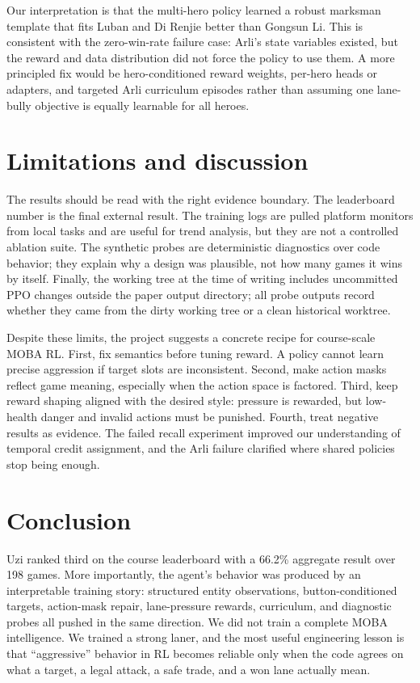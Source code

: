 \documentclass{article}
\begin{document}
Our interpretation is that the multi-hero policy learned a robust marksman template that fits Luban and Di Renjie better than Gongsun Li. This is consistent with the zero-win-rate failure case: Arli's state variables existed, but the reward and data distribution did not force the policy to use them. A more principled fix would be hero-conditioned reward weights, per-hero heads or adapters, and targeted Arli curriculum episodes rather than assuming one lane-bully objective is equally learnable for all heroes.

\section{Limitations and discussion}

The results should be read with the right evidence boundary. The leaderboard number is the final external result. The training logs are pulled platform monitors from local tasks and are useful for trend analysis, but they are not a controlled ablation suite. The synthetic probes are deterministic diagnostics over code behavior; they explain why a design was plausible, not how many games it wins by itself. Finally, the working tree at the time of writing includes uncommitted PPO changes outside the paper output directory; all probe outputs record whether they came from the dirty working tree or a clean historical worktree.

Despite these limits, the project suggests a concrete recipe for course-scale MOBA RL. First, fix semantics before tuning reward. A policy cannot learn precise aggression if target slots are inconsistent. Second, make action masks reflect game meaning, especially when the action space is factored. Third, keep reward shaping aligned with the desired style: pressure is rewarded, but low-health danger and invalid actions must be punished. Fourth, treat negative results as evidence. The failed recall experiment improved our understanding of temporal credit assignment, and the Arli failure clarified where shared policies stop being enough.

\section{Conclusion}

Uzi ranked third on the course leaderboard with a 66.2\% aggregate result over 198 games. More importantly, the agent's behavior was produced by an interpretable training story: structured entity observations, button-conditioned targets, action-mask repair, lane-pressure rewards, curriculum, and diagnostic probes all pushed in the same direction. We did not train a complete MOBA intelligence. We trained a strong laner, and the most useful engineering lesson is that ``aggressive'' behavior in RL becomes reliable only when the code agrees on what a target, a legal attack, a safe trade, and a won lane actually mean.
\end{document}
